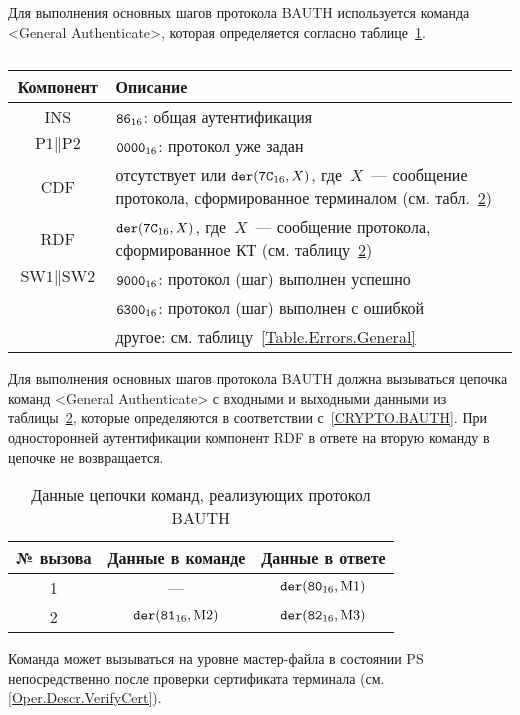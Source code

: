 Для выполнения основных шагов протокола BAUTH 
используется команда <General Authenticate>, 
которая определяется согласно 
таблице~\ref{Table.Oper.GABAUTHCmd}.

\begin{table}[hbt]
\caption{}\label{Table.Oper.GABAUTHCmd}
\begin{tabular}{|c|p{14cm}|}
\hline
Компонент & 	Описание \\
\hline
\hline
INS & $\texttt{86}_{16}$: общая аутентификация \\
\hline
$\text{P1} \parallel \text{P2}$ & $\texttt{0000}_{16}$: протокол уже задан\\ 
\hline
CDF & отсутствует или $\texttt{der}(\texttt{7C}_{16}, X)$, 
где~$X$~--- сообщение протокола, сформированное терминалом
(см. табл.~\ref{Table.Oper.BAUTH})\\
\hline 
RDF & $\texttt{der}(\texttt{7C}_{16}, X)$, где~$X$~--- 
сообщение протокола, сформированное КТ 
(см. таблицу~\ref{Table.Oper.BAUTH})\\
\hline
$\text{SW1} \parallel \text{SW2}$ & $\texttt{9000}_{16}$: протокол (шаг) выполнен успешно \\
& $\texttt{6300}_{16}$: протокол (шаг) выполнен с ошибкой\\
  & другое: см. таблицу~\ref{Table.Errors.General} \\
\hline
\end{tabular}
\end{table}

Для выполнения основных шагов протокола BAUTH
должна вызываться цепочка команд <General 
Authenticate> с входными и выходными данными из таблицы~\ref{Table.Oper.BAUTH}, 
которые определяются в соответствии с~\ref{CRYPTO.BAUTH}. 
При односторонней аутентификации компонент RDF в ответе на вторую команду
в цепочке не возвращается.

\begin{table}[hbt]
\caption{Данные цепочки команд, реализующих протокол BAUTH}
\label{Table.Oper.BAUTH}
\begin{tabular}{|c|c|c|}
\hline
№ вызова & Данные в команде & Данные в ответе\\
\hline
\hline
1 & --- & $\texttt{der}(\texttt{80}_{16}, \text{M1})$\\
\hline
2 & $\texttt{der}(\texttt{81}_{16}, \text{M2})$ & 
$\texttt{der}(\texttt{82}_{16}, \text{M3})$  \\
\hline
\end{tabular}
\end{table}

Команда может вызываться на уровне мастер-файла в состоянии PS 
непосредственно после проверки сертификата терминала
(см. \ref{Oper.Descr.VerifyCert}).


